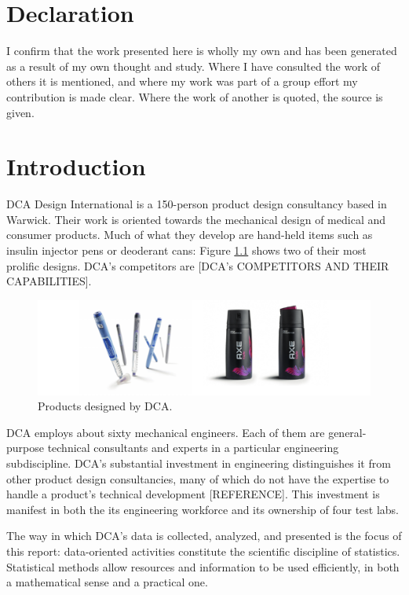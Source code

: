 \documentclass[11pt,a4paper,article]{memoir} %
\begin{document}
\chapter*{\large Declaration}
\vspace*{-\baselineskip}
I confirm that the work presented here is wholly my own and has been generated as a result of my own thought and study. Where I have consulted the work of others it is mentioned, and where my work was part of a group effort my contribution is made clear. Where the work of another is quoted, the source is given.



\newpage
\chapter{Introduction}
DCA Design International is a 150-person product design consultancy based in Warwick. Their work is oriented towards the mechanical design of medical and consumer products. Much of what they develop are hand-held items such as insulin injector pens or deoderant cans: Figure \ref{fig:dca_profile} shows two of their most prolific designs. DCA's competitors are [DCA's COMPETITORS AND THEIR CAPABILITIES].
\par
\begin{figure}[b]
\includegraphics[width=\textwidth]{DCA_profile.pdf}
\caption{Products designed by DCA.}
\label{fig:dca_profile}
\end{figure}
\par
DCA employs about sixty mechanical engineers. Each of them are general-purpose technical consultants and experts in a particular engineering subdiscipline. DCA's substantial investment in engineering distinguishes it from other product design consultancies, many of which do not have the expertise to handle a product's technical development [REFERENCE]. This investment is manifest in both the its engineering workforce and its ownership of four test labs. 
\par
 The way in which DCA's data is collected, analyzed, and presented is the focus of this report: data-oriented activities constitute the scientific discipline of statistics. Statistical methods allow resources and information to be used efficiently, in both a mathematical sense and a practical one.
\end{document}
